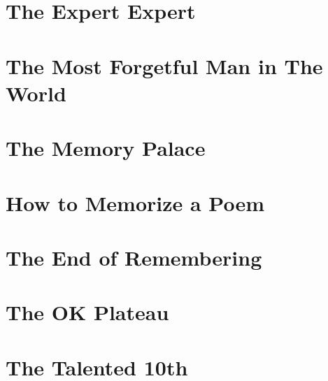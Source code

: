 \documentclass[oneside]{book}
\numberwithin{equation}{section}
\begin{document}

\section{The Expert Expert}


\section{The Most Forgetful Man in The World}


\section{The Memory Palace}


\section{How to Memorize a Poem}


\section{The End of Remembering}


\section{The OK Plateau}


\section{The Talented 10th}

\end{document}
